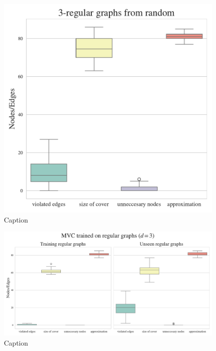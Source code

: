 \begin{figure}[h]
    \centering
    \includegraphics[width=\linewidth]{Project2TSP/_src/figures/mvc_random_to_regular.pdf}
    \caption{Caption}
    \label{fig:mvc_random_to_regular}
\end{figure}

\begin{figure}[h]
    \centering
    \includegraphics[width=\linewidth]{Project2TSP/_src/figures/mvc_regular_boxes.pdf}
    \caption{Caption}
    \label{fig:mvc_regular_to_regular}
\end{figure}

